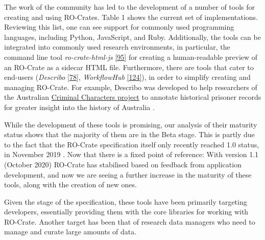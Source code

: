 {The work of the community has led to the development of a number of
tools for creating and using RO-Crates. Table 1 shows the current set of
implementations. Reviewing this list, one can see support for commonly
used programming languages, including Python, JavaScript, and Ruby.
Additionally, the tools can be integrated into commonly used research
environments, in particular, the command line tool
\emph{ro-crate-html-js}
\href{https://www.npmjs.com/package/ro-crate-html-js}{{[}95{]}} for
creating a human-readable preview of an RO-Crate as a sidecar HTML file.
Furthermore, there are tools that cater to end-users (\emph{Describo}
\href{https://arkisto-platform.github.io/describo/}{{[}78{]}},
\emph{WorkflowHub} \href{https://w3id.org/workflowhub/}{{[}124{]}}), in
order to simplify creating and managing RO-Crate. For example, Describo
was developed to help researchers of the Australian
\href{https://criminalcharacters.com/}{Criminal Characters project} to
annotate historical prisoner records for greater insight into the
history of Australia
\cite{ch5-97}.

While the development of these tools is promising, our analysis of their
maturity status shows that the majority of them are in the Beta stage.
This is partly due to the fact that the RO-Crate specification itself
only recently reached 1.0 status, in November 2019
\cite{ch5-105}. Now that there
is a fixed point of reference: With version 1.1 (October 2020)
\cite{ch5-107} RO-Crate has
stabilised based on feedback from application development, and now we
are seeing a further increase in the maturity of these tools, along with
the creation of new ones.

Given the stage of the specification, these tools have been primarily
targeting developers, essentially providing them with the core libraries
for working with RO-Crate. Another target has been that of research data
managers who need to manage and curate large amounts of data.

}
